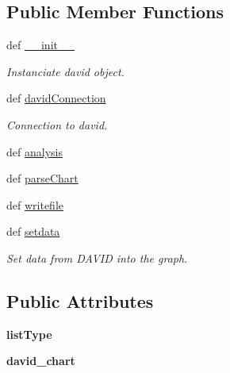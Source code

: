 \subsection*{\-Public \-Member \-Functions}
\begin{DoxyCompactItemize}
\item 
def \hyperlink{classDavid2tulip_1_1David_1_1David_a791da5d5648385b6f2392ac7b15381e7}{\-\_\-\-\_\-init\-\_\-\-\_\-}
\begin{DoxyCompactList}\small\item\em \-Instanciate david object. \end{DoxyCompactList}\item 
\hypertarget{classDavid2tulip_1_1David_1_1David_abab149bce74bafafac5d6255b6c57a5f}{
def \hyperlink{classDavid2tulip_1_1David_1_1David_abab149bce74bafafac5d6255b6c57a5f}{david\-Connection}}
\label{classDavid2tulip_1_1David_1_1David_abab149bce74bafafac5d6255b6c57a5f}

\begin{DoxyCompactList}\small\item\em \-Connection to david. \end{DoxyCompactList}\item 
def \hyperlink{classDavid2tulip_1_1David_1_1David_ac53eeb4deb4ceb84f1c6982d1154fb95}{analysis}
\item 
def \hyperlink{classDavid2tulip_1_1David_1_1David_a497780f2deb14003b4e135fb78057976}{parse\-Chart}
\item 
def \hyperlink{classDavid2tulip_1_1David_1_1David_a1b129ac7f2af7fddf99c8eec582e8da2}{writefile}
\item 
def \hyperlink{classDavid2tulip_1_1David_1_1David_a703b7a1a30a2b85e8677663fa92ff346}{setdata}
\begin{DoxyCompactList}\small\item\em \-Set data from \-D\-A\-V\-I\-D into the graph. \end{DoxyCompactList}\end{DoxyCompactItemize}
\subsection*{\-Public \-Attributes}
\begin{DoxyCompactItemize}
\item 
\hypertarget{classDavid2tulip_1_1David_1_1David_ac5e33f17248d66bcc6c30cf9596117d5}{
{\bfseries list\-Type}}
\label{classDavid2tulip_1_1David_1_1David_ac5e33f17248d66bcc6c30cf9596117d5}

\item 
\hypertarget{classDavid2tulip_1_1David_1_1David_a55ddb84d4d4d9e3d6b8bccd594f568ef}{
{\bfseries david\-\_\-chart}}
\label{classDavid2tulip_1_1David_1_1David_a55ddb84d4d4d9e3d6b8bccd594f568ef}

\end{DoxyCompactItemize}


